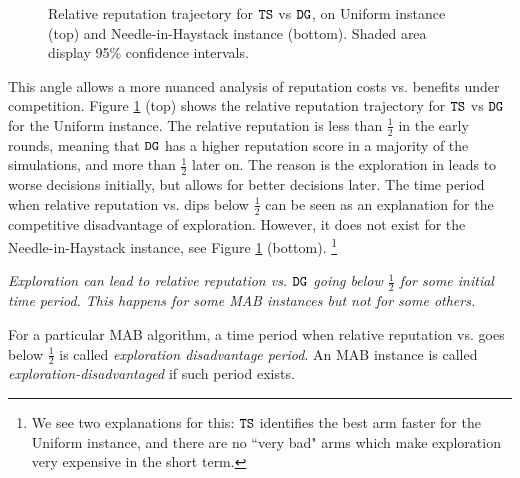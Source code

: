 \documentclass[../competing_bandits.tex]{subfiles}
\begin{document}
\begin{figure}[ht]
\caption{Relative reputation trajectory for $\mathtt{TS}$ vs $\mathtt{DG}$, on Uniform instance (top) and Needle-in-Haystack instance (bottom). Shaded area display 95\% confidence intervals.}
\label{relative_rep_plots}
\end{figure}

This angle allows a more nuanced analysis of reputation costs vs. benefits under competition. Figure \ref{relative_rep_plots} (top) shows the relative reputation trajectory for $\mathtt{TS}$ vs $\mathtt{DG}$ for the Uniform instance. The relative reputation is less than $\tfrac12$ in the early rounds, meaning that $\mathtt{DG}$ has a higher reputation score in a majority of the simulations, and more than $\tfrac12$ later on. The reason is the exploration in \TS leads to worse decisions initially, but allows for better decisions later. The time period when relative reputation vs. \DG dips below $\tfrac12$ can be seen as an explanation for the competitive disadvantage of exploration.  However, it does not exist for the Needle-in-Haystack instance, see Figure \ref{relative_rep_plots} (bottom).%
\footnote{We see two explanations for this: $\mathtt{TS}$ identifies the best arm faster  for the Uniform instance, and there are no ``very bad" arms which make exploration very expensive in the short term.}


\begin{finding}\label{find:period}
\textit{Exploration can lead to relative reputation vs. $\mathtt{DG}$ going below $\tfrac12$ for some initial time period. This happens for some MAB instances but not for some others.}
\end{finding}

\begin{definition}
For a particular MAB algorithm, a time period when relative reputation vs. \DG goes below $\tfrac12$ is called {\em exploration disadvantage period}. An MAB instance is called \emph{exploration-disadvantaged} if such period exists.
\end{definition}

\end{document}
